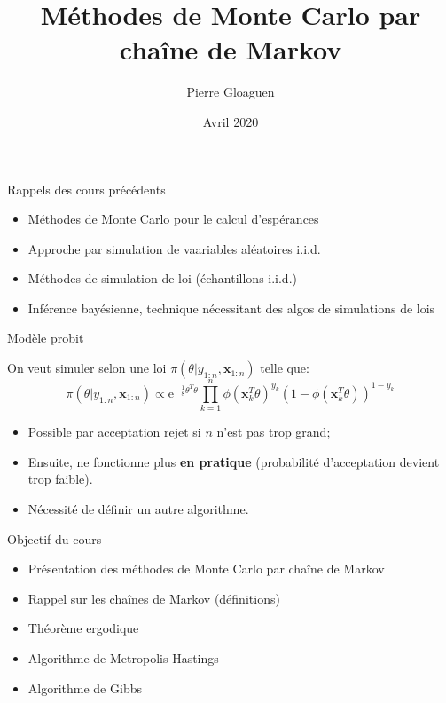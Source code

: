 \documentclass[9pt,ignorenonframetext,]{beamer}
\title{Méthodes de Monte Carlo par chaîne de Markov}
\author{Pierre Gloaguen}
\date{Avril 2020}
\providecommand{\tightlist}{%
  \setlength{\itemsep}{0pt}\setlength{\parskip}{0pt}}
\begin{document}
\frame{\titlepage}

\begin{frame}{Rappels des cours précédents}
\protect\hypertarget{rappels-des-cours-pruxe9cuxe9dents}{}

\begin{itemize}
\tightlist
\item
  Méthodes de Monte Carlo pour le calcul d'espérances
\item
  Approche par simulation de vaariables aléatoires i.i.d.
\item
  Méthodes de simulation de loi (échantillons i.i.d.)
\item
  Inférence bayésienne, technique nécessitant des algos de simulations
  de lois
\end{itemize}

\end{frame}

\begin{frame}{Modèle probit}
\protect\hypertarget{moduxe8le-probit}{}

On veut simuler selon une loi
\(\pi(\theta \vert y_{1:n}, \mathbf{x}_{1:n})\) telle que:
\[\pi(\theta \vert y_{1:n}, \mathbf{x}_{1:n}) \propto \text{e}^{-\frac{1}{8}\theta^T\theta}\prod_{k = 1}^n \phi(\mathbf{x}_k^T\theta)^{y_k} (1 - \phi(\mathbf{x}_k^T\theta))^{1 - y_k}\]

\begin{itemize}
\tightlist
\item
  Possible par acceptation rejet si \(n\) n'est pas trop grand;
\item
  Ensuite, ne fonctionne plus \textbf{en pratique} (probabilité
  d'acceptation devient trop faible).
\item
  Nécessité de définir un autre algorithme.
\end{itemize}

\end{frame}

\begin{frame}{Objectif du cours}
\protect\hypertarget{objectif-du-cours}{}

\begin{itemize}
\tightlist
\item
  Présentation des méthodes de Monte Carlo par chaîne de Markov
\item
  Rappel sur les chaînes de Markov (définitions)
\item
  Théorème ergodique
\item
  Algorithme de Metropolis Hastings
\item
  Algorithme de Gibbs
\end{itemize}

\end{frame}
\end{document}
